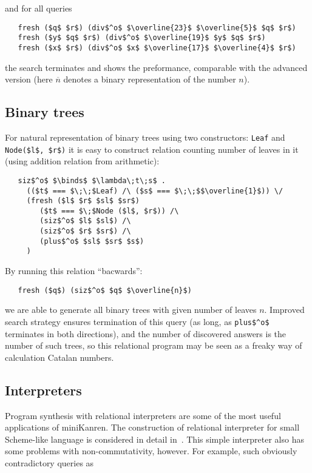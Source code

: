 \noindent and for all queries

\begin{lstlisting}
   fresh ($q$ $r$) (div$^o$ $\overline{23}$ $\overline{5}$ $q$ $r$)
   fresh ($y$ $q$ $r$) (div$^o$ $\overline{19}$ $y$ $q$ $r$)
   fresh ($x$ $r$) (div$^o$ $x$ $\overline{17}$ $\overline{4}$ $r$)
\end{lstlisting}

\noindent the search terminates and shows the preformance, comparable with the advanced version 
(here $\overline{n}$ denotes a binary representation of the number $n$).

\subsection{Binary trees}

For natural representation of binary trees using two constructors: \lstinline|Leaf| and \lstinline|Node($l$, $r$)| it is easy to construct relation counting number of leaves in it (using addition relation from arithmetic):

\begin{lstlisting}
   siz$^o$ $\binds$ $\lambda\;t\;s$ .
     (($t$ === $\;\;$Leaf) /\ ($s$ === $\;\;$$\overline{1}$)) \/
     (fresh ($l$ $r$ $sl$ $sr$)
        ($t$ === $\;$Node ($l$, $r$)) /\
        (siz$^o$ $l$ $sl$) /\
        (siz$^o$ $r$ $sr$) /\
        (plus$^o$ $sl$ $sr$ $s$)
     )
\end{lstlisting}

By running this relation ``bacwards'':

\begin{lstlisting}
   fresh ($q$) (siz$^o$ $q$ $\overline{n}$)
\end{lstlisting}

\noindent we are able to generate all binary trees with given number of leaves $n$. Improved search strategy ensures termination of this query (as long, as \lstinline|plus$^o$| terminates in both directions), and the number of discovered answers is the number of such trees, so this relational program may be seen as a freaky way of calculation Catalan numbers.

\subsection{Interpreters}

Program synthesis with relational interpreters are some of the most useful applications of miniKanren. The construction of relational interpreter for small Scheme-like language is considered 
in detail in~\cite{Untagged}. This simple interpreter also has some problems with non-commutativity, however. For example, such obviously contradictory queries as

